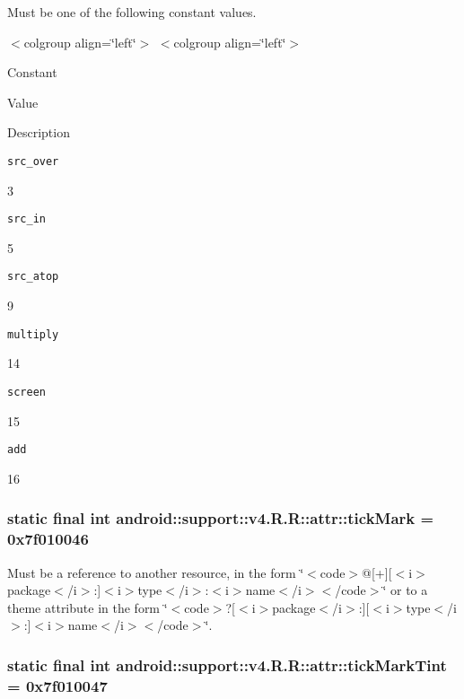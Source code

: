 Must be one of the following constant values. \begin{TabularC}{0}
\hline
\end{TabularC}
$<$colgroup align=\char`\"{}left\char`\"{}$>$ $<$colgroup align=\char`\"{}left\char`\"{}$>$ 

Constant

Value

Description 

{\tt src\_\-over}

3

{\tt src\_\-in}

5

{\tt src\_\-atop}

9

{\tt multiply}

14

{\tt screen}

15

{\tt add}

16\hypertarget{classandroid_1_1support_1_1v4_1_1_r_1_1attr_f564e1f920fde444ea4cf1d71f8e54c6}{
\subsubsection[{tickMark}]{\setlength{\rightskip}{0pt plus 5cm}static final int android::support::v4.R.R::attr::tickMark = 0x7f010046}}
\label{classandroid_1_1support_1_1v4_1_1_r_1_1attr_f564e1f920fde444ea4cf1d71f8e54c6}


Must be a reference to another resource, in the form \char`\"{}$<$code$>$@\mbox{[}+\mbox{]}\mbox{[}$<$i$>$package$<$/i$>$:\mbox{]}$<$i$>$type$<$/i$>$:$<$i$>$name$<$/i$>$$<$/code$>$\char`\"{} or to a theme attribute in the form \char`\"{}$<$code$>$?\mbox{[}$<$i$>$package$<$/i$>$:\mbox{]}\mbox{[}$<$i$>$type$<$/i$>$:\mbox{]}$<$i$>$name$<$/i$>$$<$/code$>$\char`\"{}. \hypertarget{classandroid_1_1support_1_1v4_1_1_r_1_1attr_119016cd4771d79b024fdfdcf6ede753}{
\subsubsection[{tickMarkTint}]{\setlength{\rightskip}{0pt plus 5cm}static final int android::support::v4.R.R::attr::tickMarkTint = 0x7f010047}}
\label{classandroid_1_1support_1_1v4_1_1_r_1_1attr_119016cd4771d79b024fdfdcf6ede753}



